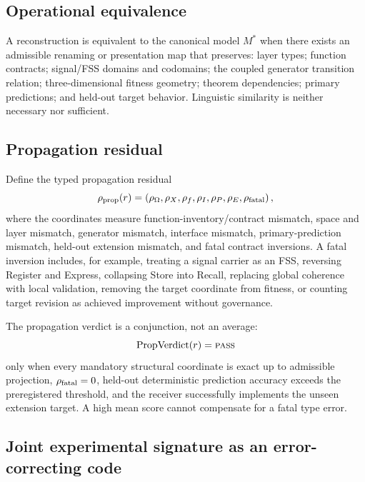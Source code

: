 \documentclass[11pt]{article}
\newcommand{\Mstar}{M^{\ast}}
\newcommand{\PropRes}{\rho_{\rm prop}}
\newcommand{\Pass}{\textsc{pass}}
\begin{document}
\subsection{Operational equivalence}

A reconstruction is equivalent to the canonical model $\Mstar$ when there exists an admissible renaming or presentation map that preserves: layer types; function contracts; signal/FSS domains and codomains; the coupled generator transition relation; three-dimensional fitness geometry; theorem dependencies; primary predictions; and held-out target behavior. Linguistic similarity is neither necessary nor sufficient.

\subsection{Propagation residual}

Define the typed propagation residual
\begin{equation}
\PropRes(r)=\left(\rho_{\Omega},\rho_{X},\rho_f,\rho_{I},\rho_{P},\rho_{E},\rho_{\rm fatal}\right),
\end{equation}
where the coordinates measure function-inventory/contract mismatch, space and layer mismatch, generator mismatch, interface mismatch, primary-prediction mismatch, held-out extension mismatch, and fatal contract inversions. A fatal inversion includes, for example, treating a signal carrier as an FSS, reversing Register and Express, collapsing Store into Recall, replacing global coherence with local validation, removing the target coordinate from fitness, or counting target revision as achieved improvement without governance.

The propagation verdict is a conjunction, not an average:
\begin{equation}
\operatorname{PropVerdict}(r)=\Pass
\end{equation}
only when every mandatory structural coordinate is exact up to admissible projection, $\rho_{\rm fatal}=0$, held-out deterministic prediction accuracy exceeds the preregistered threshold, and the receiver successfully implements the unseen extension target. A high mean score cannot compensate for a fatal type error.

\subsection{Joint experimental signature as an error-correcting code}
\end{document}
